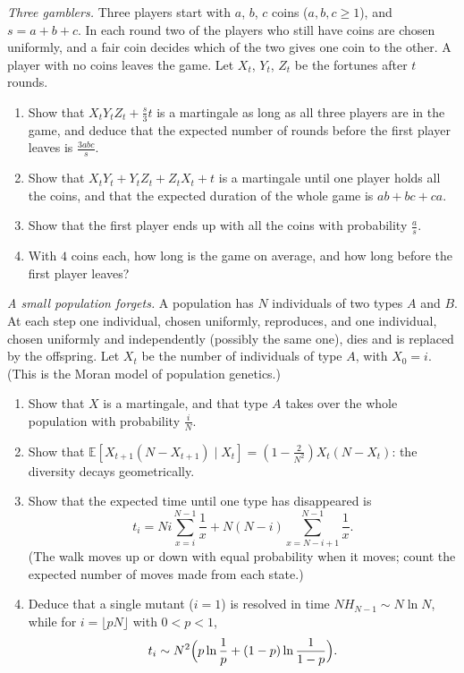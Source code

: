 \begin{exercise}[$\star\star$]\label{pb:threegamblers}
\emph{Three gamblers.} Three players start with $a$, $b$, $c$ coins ($a,b,c\ge1$), and $s=a+b+c$. In each round two of the players who still
have coins are chosen uniformly, and a fair coin decides which of the two gives one coin to the other. A player with no coins
leaves the game. Let $X_t$, $Y_t$, $Z_t$ be the fortunes after $t$ rounds.
\begin{enumerate}[label=(\alph*)]
\item Show that $X_tY_tZ_t+\frac s3t$ is a martingale as long as all three players are in the game, and deduce that the expected number of
rounds before the first player leaves is $\frac{3abc}s$.
\item Show that $X_tY_t+Y_tZ_t+Z_tX_t+t$ is a martingale until one player holds all the coins, and that the expected duration of the whole
game is $ab+bc+ca$.
\item Show that the first player ends up with all the coins with probability $\frac as$.
\item With $4$ coins each, how long is the game on average, and how long before the first player leaves?
\end{enumerate}
\end{exercise}

\begin{exercise}[$\star\star\star$]\label{pb:moran}
\emph{A small population forgets.} A population has $N$ individuals of two types $A$ and $B$. At each step one individual, chosen
uniformly, reproduces, and one individual, chosen uniformly and independently (possibly the same one), dies and is replaced by the
offspring. Let $X_t$ be the number of individuals of type $A$, with $X_0=i$. (This is the Moran model of population genetics.)
\begin{enumerate}[label=(\alph*)]
\item Show that $X$ is a martingale, and that type $A$ takes over the whole population with probability $\frac iN$.
\item Show that $\mathbb E[X_{t+1}(N-X_{t+1})\mid X_t]=(1-\frac2{N^2})X_t(N-X_t)$: the diversity decays geometrically.
\item Show that the expected time until one type has disappeared is
\[
t_i=Ni\sum_{x=i}^{N-1}\frac1x+N(N-i)\sum_{x=N-i+1}^{N-1}\frac1x.
\]
(The walk moves up or down with equal probability when it moves; count the expected number of moves made from each state.)
\item Deduce that a single mutant ($i=1$) is resolved in time $NH_{N-1}\sim N\ln N$, while for $i=\lfloor pN\rfloor$ with $0<p<1$,
\[
t_i\sim N^2\Bigl(p\ln\frac1p+(1-p)\ln\frac1{1-p}\Bigr).
\]
\end{enumerate}
\end{exercise}

